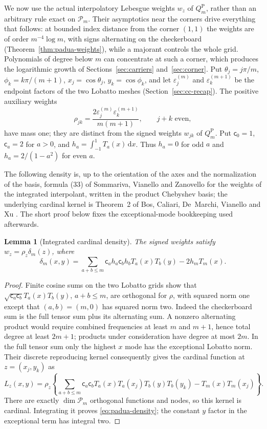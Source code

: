 \documentclass[preprint,12pt,a4paper]{elsarticle}
\newtheorem{lemma}[theorem]{Lemma}
\theoremstyle{remark}
\newcommand{\Pa}{\mathrm P}
\newcommand{\dd}{\,\mathrm d}
\begin{document}
We now use the actual interpolatory Lebesgue weights $w_z$ of $Q_m^\Pa$,
rather than an arbitrary rule exact on $\mathcal P_m$. Their asymptotics near
the corners drive everything that follows: at bounded index distance from the
corner $(1,1)$ the weights are of order $m^{-4}\log m$, with signs alternating on
the checkerboard (Theorem~\ref{thm:padua-weights}), while a majorant controls the
whole grid. Polynomials of degree below $m$ can concentrate at such a corner,
which produces the logarithmic growth of Sections~\ref{sec:carriers}
and~\ref{sec:corner}.
Put $\theta_j=j\pi/m$, $\phi_k=k\pi/(m+1)$, $x_j=\cos\theta_j$,
$y_k=\cos\phi_k$, and let
$\varepsilon^{(m)}_j$ and $\varepsilon^{(m+1)}_k$ be the endpoint factors of the two
Lobatto meshes (Section~\ref{sec:cc-recap}). The positive auxiliary weights
\[
 \rho_{jk}=\frac{2\varepsilon^{(m)}_j\varepsilon^{(m+1)}_k}{m(m+1)},\qquad j+k\text{ even},
\]
have mass one; they are distinct from the signed weights $w_{jk}$ of
$Q_m^\Pa$. Put $\mathsf c_0=1$, $\mathsf c_a=2$ for $a>0$, and
$h_a=\int_{-1}^1T_a(x)\dd x$. Thus $h_a=0$ for odd $a$ and
$h_a=2/(1-a^2)$ for even $a$.

The following density is, up to the orientation of the axes and the
normalization of the basis, formula (33) of Sommariva, Vianello and
Zanovello \cite{SVZ08} for the weights of the integrated interpolant, written
in the product Chebyshev basis; the underlying cardinal kernel is
Theorem~2 of Bos, Caliari, De~Marchi, Vianello and Xu \cite{BCDMVX06}.
The short proof below fixes the exceptional-mode bookkeeping used afterwards.

\begin{lemma}[Integrated cardinal density]\label{lem:density}
The signed weights satisfy $w_z=\rho_z\delta_m(z)$, where
\begin{equation}\label{eq:padua-density}
 \delta_m(x,y)=\sum_{a+b\le m}\mathsf c_ah_a\mathsf c_bh_bT_a(x)T_b(y)-2h_mT_m(x).
\end{equation}
\end{lemma}
\begin{proof}
Finite cosine sums on the two Lobatto grids show that
$\sqrt{\mathsf c_a\mathsf c_b}T_a(x)T_b(y)$, $a+b\le m$, are orthogonal for $\rho$,
with squared norm one except that $(a,b)=(m,0)$ has squared norm two.
Indeed the checkerboard sum is the full tensor sum plus its alternating
sum. A nonzero alternating product would require combined frequencies
at least $m$ and $m+1$, hence total degree at least $2m+1$;
products under consideration have degree at most $2m$. In the full tensor
sum only the highest $x$ mode has the exceptional Lobatto norm.
Their discrete reproducing kernel consequently gives the cardinal function
at $z=(x_j,y_k)$ as
\[
 L_z(x,y)=\rho_z\left\{\sum_{a+b\le m}\mathsf c_a\mathsf c_b
 T_a(x)T_a(x_j)T_b(y)T_b(y_k)-T_m(x)T_m(x_j)\right\}.
\]
There are exactly $\dim\mathcal P_m$ orthogonal functions and nodes,
so this kernel is cardinal. Integrating it proves
\eqref{eq:padua-density}; the constant $y$ factor in the exceptional
term has integral two.
\end{proof}
\end{document}
